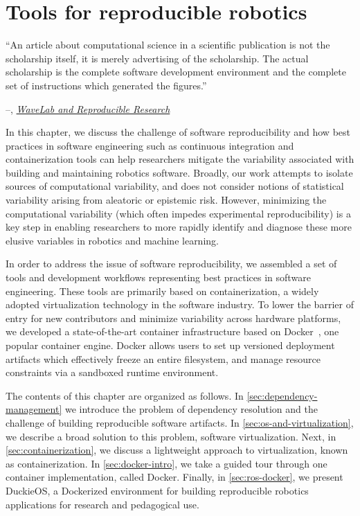 \chapter{Tools for reproducible robotics}\label{ch:ducker}

\setlength{\epigraphwidth}{0.73\textwidth}
\epigraph{``An article about computational science in a scientific publication is not the scholarship itself, it is merely advertising of the scholarship. The actual scholarship is the complete software development environment and the complete set of instructions which generated the figures.''}{\begin{flushright}--\citet{buckheit1995wavelab}, \href{https://statweb.stanford.edu/~wavelab/Wavelab_850/wavelab.pdf}{\textit{WaveLab and Reproducible Research}}\end{flushright}}

In this chapter, we discuss the challenge of software reproducibility and how best practices in software engineering such as continuous integration and containerization tools can help researchers mitigate the variability associated with building and maintaining robotics software. Broadly, our work attempts to isolate sources of computational variability, and does not consider notions of statistical variability arising from aleatoric or epistemic risk. However, minimizing the computational variability (which often impedes experimental reproducibility) is a key step in enabling researchers to more rapidly identify and diagnose these more elusive variables in robotics and machine learning.

In order to address the issue of software reproducibility, we assembled a set of tools and development workflows representing best practices in software engineering. These tools are primarily based on containerization, a widely adopted virtualization technology in the software industry. To lower the barrier of entry for new contributors and minimize variability across hardware platforms, we developed a state-of-the-art container infrastructure based on Docker~\citep{merkel2014docker}, one popular container engine. Docker allows users to set up versioned deployment artifacts which effectively freeze an entire filesystem, and manage resource constraints via a sandboxed runtime environment.

The contents of this chapter are organized as follows. In \autoref{sec:dependency-management} we introduce the problem of dependency resolution and the challenge of building reproducible software artifacts. In \autoref{sec:os-and-virtualization}, we describe a broad solution to this problem, software virtualization. Next, in \autoref{sec:containerization}, we discuss a lightweight approach to virtualization, known as containerization. In \autoref{sec:docker-intro}, we take a guided tour through one container implementation, called Docker. Finally, in \autoref{sec:ros-docker}, we present DuckieOS, a Dockerized environment for building reproducible robotics applications for research and pedagogical use.

